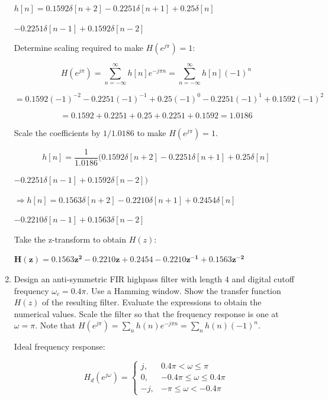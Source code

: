 \documentclass[fleqn]{article}
\begin{document}
\begin{enumerate}[nolistsep]
		$h[n] = 0.1592\delta[n+2] - 0.2251\delta[n+1] + 0.25\delta[n]$
		
		$ - 0.2251\delta[n-1] +  0.1592\delta[n-2]$
		
		Determine scaling required to make $H(e^{j\pi}) = 1$:
		
		\begin{equation*}
			H(e^{j\pi}) = \sum_{n=-\infty}^{\infty}{h[n]e^{-j{\pi}n}} = \sum_{n=-\infty}^{\infty}{h[n](-1)^n}
		\end{equation*}
		
		\begin{equation*}
			= 0.1592(-1)^{-2} - 0.2251(-1)^{-1} + 0.25(-1)^{0} - 0.2251(-1)^{1} +  0.1592(-1)^{2}
		\end{equation*}
		
		\begin{equation*}
			= 0.1592 + 0.2251 + 0.25 + 0.2251 + 0.1592 = 1.0186
		\end{equation*}
		
		Scale the coefficients by $1/1.0186$ to make $H(e^{j\pi}) = 1$.
		
		\begin{equation*}
			h[n] = \frac{1}{1.0186}(0.1592\delta[n+2] - 0.2251\delta[n+1] + 0.25\delta[n]
		\end{equation*}
		
		$- 0.2251\delta[n-1] +  0.1592\delta[n-2])$
		
		$\Rightarrow h[n] = 0.1563\delta[n+2] - 0.2210\delta[n+1] + 0.2454\delta[n]$
		
		$- 0.2210\delta[n-1] +  0.1563\delta[n-2]$
		
		Take the z-transform to obtain $H(z)$:
		
		$\mathbf{H(z) = 0.1563z^2 - 0.2210z + 0.2454 - 0.2210z^{-1} +  0.1563z^{-2}}$
		
		\item Design an anti-symmetric FIR highpass filter with length $4$ and digital cutoff frequency $\omega_c = 0.4\pi$. Use a Hamming window. Show the transfer function $H(z)$ of the resulting filter. Evaluate the expressions to obtain the numerical values. Scale the filter so that the frequency response is one at $\omega = \pi$. Note that $H(e^{j\pi}) = \sum_{n}{h(n)e^{-j{\pi}n}} = \sum_{n}{h(n)(-1)^n}$.
		
		Ideal frequency response:
		
		\begin{equation*}
			H_d(e^{j\omega}) =
			\begin{cases}
				j, & 0.4\pi < \omega \leq \pi \\
				0, & -0.4\pi \leq \omega \leq 0.4\pi \\
				-j, & -\pi \leq \omega < -0.4\pi
			\end{cases}
		\end{equation*}
		

\end{enumerate}
\end{document}
